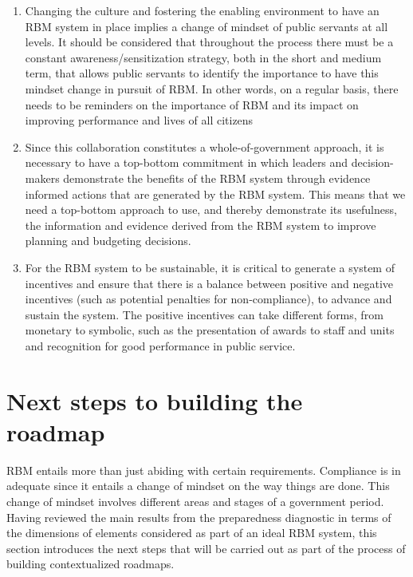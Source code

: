 \documentclass[
  10pt,
]{book}
\begin{document}
\begin{enumerate}
\def\labelenumi{\arabic{enumi}.}
\item
  Changing the culture and fostering the enabling environment to have an RBM system in place implies a change of mindset of public servants at all levels. It should be considered that throughout the process there must be a constant awareness/sensitization strategy, both in the short and medium term, that allows public servants to identify the importance to have this mindset change in pursuit of RBM. In other words, on a regular basis, there needs to be reminders on the importance of RBM and its impact on improving performance and lives of all citizens
\item
  Since this collaboration constitutes a whole-of-government approach, it is necessary to have a top-bottom commitment in which leaders and decision-makers demonstrate the benefits of the RBM system through evidence informed actions that are generated by the RBM system. This means that we need a top-bottom approach to use, and thereby demonstrate its usefulness, the information and evidence derived from the RBM system to improve planning and budgeting decisions.
\item
  For the RBM system to be sustainable, it is critical to generate a system of incentives and ensure that there is a balance between positive and negative incentives (such as potential penalties for non-compliance), to advance and sustain the system. The positive incentives can take different forms, from monetary to symbolic, such as the presentation of awards to staff and units and recognition for good performance in public service.
\end{enumerate}

\hypertarget{section6}{%
\chapter{Next steps to building the roadmap}\label{section6}}

RBM entails more than just abiding with certain requirements. Compliance is in adequate since it entails a change of mindset on the way things are done. This change of mindset involves different areas and stages of a government period. Having reviewed the main results from the preparedness diagnostic in terms of the dimensions of elements considered as part of an ideal RBM system, this section introduces the next steps that will be carried out as part of the process of building contextualized roadmaps.
\end{document}
